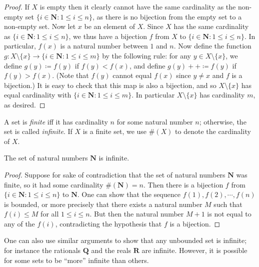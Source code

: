 \begin{proof}
If \(X\) is empty then it clearly cannot have the same cardinality as the non-empty set \(\{i \in \mathbf{N} : 1 \leq i \leq n\}\), as there is no bijection from the empty set to a non-empty set.
Now let \(x\) be an element of \(X\).
Since \(X\) has the same cardinality as \(\{i \in \mathbf{N} : 1 \leq i \leq n\}\), we thus have a bijection \(f\) from \(X\) to \(\{i \in \mathbf{N} : 1 \leq i \leq n\}\).
In particular, \(f(x)\) is a natural number between \(1\) and \(n\).
Now define the function \(g : X \setminus \{x\} \to \{i \in \mathbf{N} : 1 \leq i \leq m\}\) by the following rule: for any \(y \in X \setminus \{x\}\), we define \(g(y) \coloneqq f(y)\) if \(f(y) < f(x)\), and define \(g(y)++ \coloneqq f(y)\) if \(f(y) > f(x)\).
(Note that \(f(y)\) cannot equal \(f(x)\) since \(y \neq x\) and \(f\) is a bijection.)
It is easy to check that this map is also a bijection, and so \(X \setminus \{x\}\) has equal cardinality with \(\{i \in \mathbf{N} : 1 \leq i \leq m\}\).
In particular \(X \setminus \{x\}\) has cardinality \(m\), as desired.
\end{proof}

\begin{definition}\label{3.6.10}
A set is \emph{finite} iff it has cardinality \(n\) for some natural number \(n\);
otherwise, the set is called \emph{infinite}.
If \(X\) is a finite set, we use \(\#(X)\) to denote the cardinality of \(X\).
\end{definition}

\setcounter{theorem}{11}
\begin{theorem}\label{3.6.12}
The set of natural numbers \(\mathbf{N}\) is infinite.
\end{theorem}

\begin{proof}
Suppose for sake of contradiction that the set of natural numbers \(\mathbf{N}\) was finite, so it had some cardinality \(\#(\mathbf{N}) = n\).
Then there is a bijection \(f\) from \(\{i \in \mathbf{N} : 1 \leq i \leq n\}\) to \(\mathbf{N}\).
One can show that the sequence \(f(1), f(2), \cdots, f(n)\) is bounded, or more precisely that there exists a natural number \(M\) such that \(f(i) \leq M\) for all \(1 \leq i \leq n\).
But then the natural number \(M+1\) is not equal to any of the \(f(i)\), contradicting the hypothesis that \(f\) is a bijection.
\end{proof}

\begin{remark}\label{3.6.13}
One can also use similar arguments to show that any unbounded set is infinite;
for instance the rationals \(\mathbf{Q}\) and the reals \(\mathbf{R}\) are infinite.
However, it is possible for some sets to be ``more'' infinite than others.
\end{remark}

